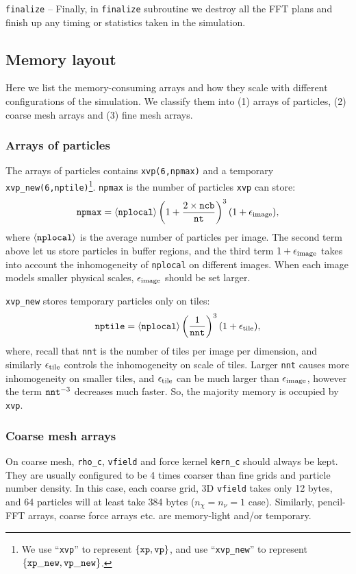\documentclass[10pt,twocolumn,preprint]{emulateapj}
\begin{document}
{\tt finalize} --
Finally, in {\tt finalize} subroutine we destroy all the FFT plans and finish up any timing or statistics taken in the simulation.

\subsection{Memory layout}\label{ss.memory}
Here we list the memory-consuming arrays and how they scale with different configurations of the simulation. We classify them into (1) arrays of particles, (2) coarse mesh arrays and (3) fine mesh arrays.

\subsubsection{Arrays of particles}
The arrays of particles contains {\tt xvp(6,npmax)} and a temporary {\tt xvp\_new(6,nptile)}\footnote{We use ``{\tt xvp}'' to represent $\{{\tt xp},{\tt vp}\}$, and use ``{\tt xvp\_new}'' to represent $\{{\tt xp\_new},{\tt vp\_new}\}$.}. {\tt npmax} is the number of particles {\tt xvp} can store:
\begin{equation}\label{eq.npmax}
	{\tt npmax}=\left\langle {\tt nplocal} \right\rangle \left( 1+\frac{2\times {\tt ncb}}{\tt nt} \right)^3(1+\epsilon_{\rm image}),
\end{equation}
where $\left\langle {\tt nplocal} \right\rangle$ is the average number of particles per image. The second term above let us store particles in buffer regions, and the third term $1+\epsilon_{\rm image}$ takes into account the inhomogeneity of {\tt nplocal} on different images. When each image models smaller physical scales, $\epsilon_{\rm image}$ should be set larger. 

{\tt xvp\_new} stores temporary particles only on tiles:
\begin{equation}\label{eq.nptile}
	{\tt nptile}=\left\langle {\tt nplocal} \right\rangle \left( \frac{1}{\tt nnt} \right)^3(1+\epsilon_{\rm tile}),
\end{equation}
where, recall that {\tt nnt} is the number of tiles per image per dimension, and similarly $\epsilon_{\rm tile}$ controls the inhomogeneity on scale of tiles. Larger {\tt nnt} causes more inhomogeneity on smaller tiles, and $\epsilon_{\rm tile}$ can be much larger than $\epsilon_{\rm image}$, however the term ${\tt nnt}^{-3}$ decreases much faster. So, the majority memory is occupied by {\tt xvp}.

\subsubsection{Coarse mesh arrays}
On coarse mesh, {\tt rho\_c}, {\tt vfield} and force kernel {\tt kern\_c} should always be kept. They are usually configured to be 4 times coarser than fine grids and particle number density. In this case, each coarse grid, 3D {\tt vfield} takes only 12 bytes, and 64 particles will at least take 384 bytes ($n_\chi=n_\nu=1$ case). Similarly, pencil-FFT arrays, coarse force arrays etc. are memory-light and/or temporary.
\end{document}
